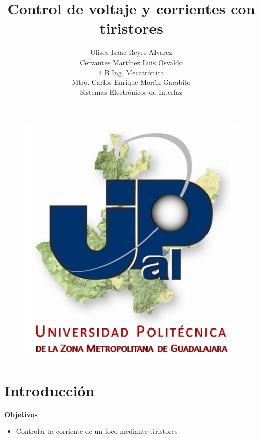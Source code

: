 \documentclass[10pt,a4paper]{article}
\author{Ulises Isaac Reyes Alvarez\\Cervantes Martínez Luis Osvaldo\\4.B Ing. Mecatrónica\\Mtro. Carlos Enrique Morán Garabito\\Sistemas Electrónicos de Interfaz}
\title{Control de voltaje y corrientes con tiristores}
\begin{document}
\maketitle
\begin{figure}[hbtp]
\centering
\includegraphics[scale=1.75]{Pictures/UPZMG.png}
\end{figure}

\newpage
\section{Introducción}
\textbf{Objetivos}
\begin{itemize}
\item Controlar la corriente de un foco mediante tiristores
\end{itemize}
\end{document}
